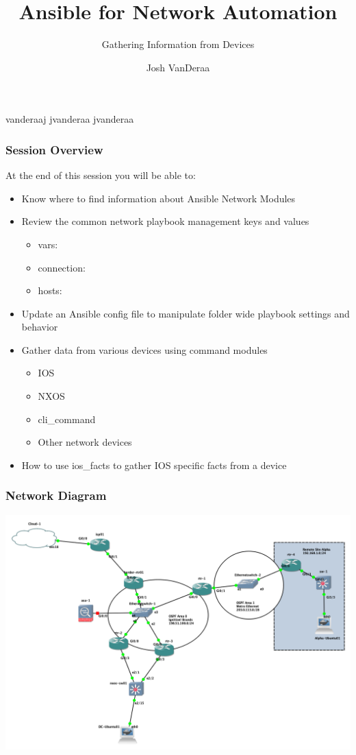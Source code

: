 \documentclass{beamer}
\title{Ansible for Network Automation}
\subtitle{Gathering Information from Devices}
\date{}
\author{Josh VanDeraa}
\begin{document}
\begin{frame}
  \maketitle
  \footnotesize
  \faTwitter vanderaaj \hfill \faGithub jvanderaa \hfill \faSlack jvanderaa
\end{frame}

\begin{frame}
  \frametitle{Session Overview}
  At the end of this session you will be able to:
  \begin{itemize}
    \item <2-> Know where to find information about Ansible Network Modules
    \item <3-> Review the common network playbook management keys and values
      \begin{itemize}
        \item <3-> vars:
        \item <4-> connection:
        \item <5-> hosts:
      \end{itemize}
    \item <6-> Update an Ansible config file to manipulate folder wide playbook settings and behavior
    \item <7-> Gather data from various devices using command modules
      \begin{itemize}
        \item IOS
        \item NXOS
        \item cli\_command
        \item Other network devices
      \end{itemize}
    \item <8-> How to use ios\_facts to gather IOS specific facts from a device
  \end{itemize}
\end{frame}

\begin{frame}
\frametitle{Network Diagram}
\includegraphics[width=\textwidth]{assets/base_setup.png}
\end{frame}
\end{document}
